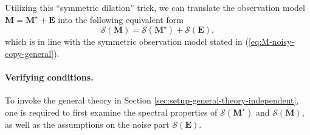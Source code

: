 Utilizing this ``symmetric dilation'' trick, we can translate the observation
model $\bm{M}=\bm{M}^{\star}+\bm{E}$ into the following equivalent
form
\[
\mathcal{S}(\bm{M})=\mathcal{S}(\bm{M}^{\star})+\mathcal{S}(\bm{E}),
\]
which is in line with the symmetric observation model stated in
(\ref{eq:M-noisy-copy-general}). 



\paragraph{Verifying conditions. }

To invoke the general theory in Section \ref{sec:setup-general-theory-independent},
one is required to first examine the spectral properties of $\mathcal{S}(\bm{M}^{\star})$
and $\mathcal{S}(\bm{M})$, as well as the  assumptions on the noise part
$\mathcal{S}(\bm{E})$. 


